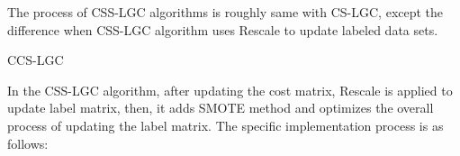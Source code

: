 \documentclass{svjour3}                     %
\begin{document}
 The process of CSS-LGC algorithms is roughly same with CS-LGC, except the difference when CSS-LGC
algorithm uses Rescale to update labeled data sets. 
\begin{algorithm}[ht] 
  \begin{algorithmic}[1]
    \ENDWHILE
  \end{algorithmic}
  \caption{CCS-LGC}
  \label{algo:ccs-lgc}
\end{algorithm} 
In the CSS-LGC algorithm, after updating the cost matrix, Rescale is applied to update label matrix, then, it adds SMOTE method and optimizes the overall process of updating the label matrix. The
specific implementation process is as follows:
\end{document}

